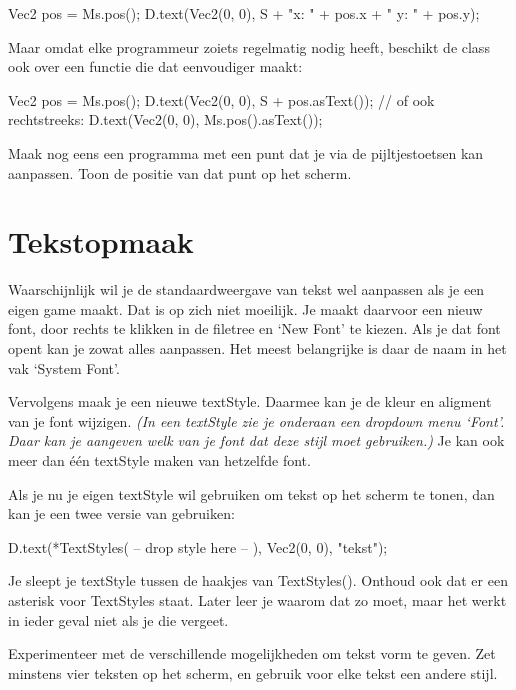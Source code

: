 \begin{code}
Vec2 pos = Ms.pos();
D.text(Vec2(0, 0), S + "x: " + pos.x + " y: " + pos.y);
\end{code}

Maar omdat elke programmeur zoiets regelmatig nodig heeft, beschikt de class  ook over een functie die dat eenvoudiger maakt:

\begin{code}
Vec2 pos = Ms.pos();
D.text(Vec2(0, 0), S + pos.asText());
// of ook rechtstreeks:
D.text(Vec2(0, 0), Ms.pos().asText());
\end{code}

\begin{exercise}
Maak nog eens een programma met een punt dat je via de pijltjestoetsen kan aanpassen. Toon de positie van dat punt op het scherm.
\end{exercise}

\section{Tekstopmaak}
\label{chapter:tekstopmaak}
Waarschijnlijk wil je de standaardweergave van tekst wel aanpassen als je een eigen game maakt. Dat is op zich niet moeilijk. Je maakt daarvoor een nieuw font, door rechts te klikken in de filetree en `New Font' te kiezen. Als je dat font opent kan je zowat alles aanpassen. Het meest belangrijke is daar de naam in het vak `System Font'.

Vervolgens maak je een nieuwe textStyle. Daarmee kan je de kleur en aligment van je font wijzigen. \textsl{(In een textStyle zie je onderaan een dropdown menu `Font'. Daar kan je aangeven welk van je font dat deze stijl moet gebruiken.)} Je kan ook meer dan \'e\'en textStyle maken van hetzelfde font.

Als je nu je eigen textStyle wil gebruiken om tekst op het scherm te tonen, dan kan je een twee versie van  gebruiken:

\begin{code}
D.text(*TextStyles( -- drop style here -- ), Vec2(0, 0), "tekst");
\end{code}

Je sleept je textStyle tussen de haakjes van TextStyles(). Onthoud ook dat er een asterisk voor TextStyles staat. Later leer je waarom dat zo moet, maar het werkt in ieder geval niet als je die vergeet.

\begin{exercise}
Experimenteer met de verschillende mogelijkheden om tekst vorm te geven. Zet minstens vier teksten op het scherm, en gebruik voor elke tekst een andere stijl.
\end{exercise}